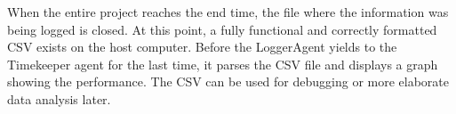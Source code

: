 \documentclass[paper=a4, fontsize=11pt]{scrartcl}
\begin{document}
    When the entire project reaches the end time, the file where the information
    was being logged is closed. At this point, a fully functional and correctly
    formatted CSV exists on the host computer. Before the LoggerAgent yields
    to the Timekeeper agent for the last time, it parses the CSV file and
    displays a graph showing the performance. The CSV can be used for debugging
    or more elaborate data analysis later.



		{}
		
\end{document}
